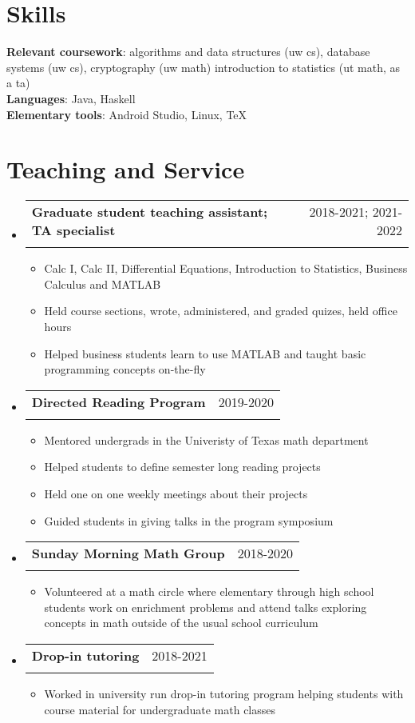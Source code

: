 \documentclass[letterpaper,11pt]{article}
\makeatletter
\newcommand{\resumeItem}[1]{
  \item{
    {#1 \vspace{-4pt}}
  }
}
\newcommand{\resumeSubheading}[4]{
  \vspace{-2pt}\item
    \begin{tabular*}{0.97\textwidth}[t]{l@{\extracolsep{\fill}}r}
      \textbf{#1} & #2 \\
      \textit{\small #3} & \textit{\small #4} \\
    \end{tabular*}\vspace{-10pt}
}
\newcommand{\resumeSubHeadingListStart}{\begin{itemize}[leftmargin=0.15in, label={}]}
\newcommand{\resumeSubHeadingListEnd}{\end{itemize}}
\newcommand{\resumeItemListStart}{\begin{itemize}}
\newcommand{\resumeItemListEnd}{\end{itemize}\vspace{-2pt}}
\makeatother
\begin{document}
\section{Skills}
\begin{itemize}[leftmargin=0.15in, label={}]
    \normalsize{\item{
     \textbf{Relevant coursework}{: algorithms and data structures (uw cs), 
                                    database systems (uw cs), 
                                    cryptography (uw math)
                                   introduction to statistics (ut math, as a ta)
     } \\
     \textbf{Languages}{: Java, 
                          Haskell
     }\\
     \textbf{Elementary tools}{: Android Studio, 
                                 Linux, 
                                 \TeX
     }
    }}
 \end{itemize}

\section{Teaching and Service}
\resumeSubHeadingListStart
  \resumeSubheading{Graduate student teaching assistant; TA specialist}
                   {2018-2021; 2021-2022}
                   {}{}\vspace{-2ex}
    \resumeItemListStart\small
      \resumeItem{Calc I, 
                  Calc II, 
                  Differential Equations, 
                  Introduction to Statistics, 
                  Business Calculus and MATLAB}
      \resumeItem{Held course sections, 
                  wrote, administered, and graded quizes, 
                  held office hours}
      \resumeItem{Helped business students learn to use MATLAB and taught basic programming 
                  concepts on-the-fly}
    \resumeItemListEnd
  \resumeSubheading{Directed Reading Program}{2019-2020}{}{}\vspace{-2ex}
    \resumeItemListStart\small
      \resumeItem{Mentored undergrads in the Univeristy of Texas math department}
      \resumeItem{Helped students to define semester long reading projects}
      \resumeItem{Held one on one weekly meetings about their projects}
      \resumeItem{Guided students in giving talks in the program symposium}
    \resumeItemListEnd
  \resumeSubheading{Sunday Morning Math Group}{2018-2020}{}{}\vspace{-2ex}
    \resumeItemListStart\small
      \resumeItem{Volunteered at a math circle where elementary through high school 
                 students work on enrichment problems and attend talks exploring 
                 concepts in math outside of the usual school curriculum}
    \resumeItemListEnd
  \resumeSubheading{Drop-in tutoring}{2018-2021}{}{}\vspace{-2ex}
    \resumeItemListStart\small
      \resumeItem{Worked in university run drop-in tutoring program helping students 
                  with course material for undergraduate math classes}
    \resumeItemListEnd
\resumeSubHeadingListEnd
\end{document}

